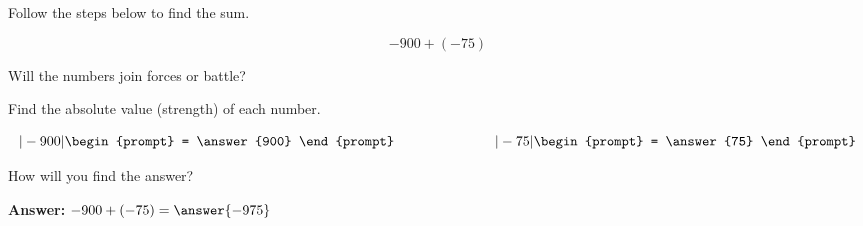 \documentclass{ximera}[font=12pt]
\begin{document}
\begin{problem}
Follow the steps below to find the sum.

\[ -900 + (-75) \]

Will the numbers join forces or battle?

\begin{multipleChoice}
\end{multipleChoice}

\begin{problem}
Find the absolute value (strength) of each number.

\[ |-900| \begin{prompt} = \answer{900} \end{prompt} \hspace{1in} |-75| \begin{prompt} = \answer{75} \end{prompt} \]

\begin{problem}
How will you find the answer?

\begin{multipleChoice}
\end{multipleChoice}
 
\begin{problem}


\textbf{Answer:}  $-900 + (-75) = \answer{-975}$

\end{problem}
\end{problem}
\end{problem}
\end{problem}
\end{document}
